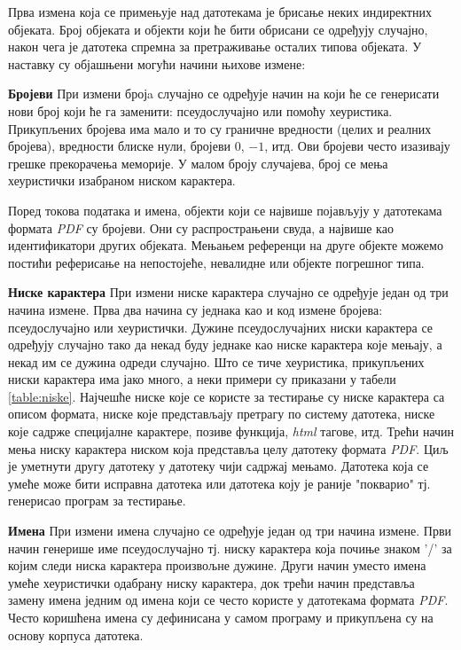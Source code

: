 \documentclass[12pt,oneside]{memoir}
\begin{document}
Прва измена која се примењује над датотекама је брисање неких индиректних објеката. Број објеката и објекти који ће бити обрисани се одређују случајно, након чега је датотека спремна за претраживање осталих типова објеката.
У наставку су објашњени могући начини њихове измене:
\begin{description}
\item{\textbf{Бројеви}} При измени бројa случајно се одређује начин на који ће се генерисати нови број који ће га заменити: псеудослучајно или помоћу хеуристика. Прикупљених бројева има мало и то су граничне вредности (целих и реалних бројева), вредности блиске нули, бројеви $0$, $-1$, итд. Ови бројеви често изазивају грешке прекорачења меморије. У малом броју случајева, број се мења хеуристички изабраном ниском карактера. 

Поред токова података и имена, објекти који се највише појављују у датотекама формата \textit{PDF} су бројеви. Они су распрострањени свуда, а највише као идентификатори других објеката. Мењањем референци на друге објекте можемо постићи реферисање на непостојеће, невалидне или објекте погрешног типа.  
\item{\textbf{Ниске карактера}} При измени ниске карактера случајно се одређује један од три начина измене. Прва два начина су једнака као и код измене бројева: псеудослучајно или хеуристички. Дужине псеудослучајних ниски карактера се одређују случајно тако да некад буду једнаке као ниске карактера које мењају, а некад им се дужина одреди случајно. Што се тиче хеуристика, прикупљених ниски карактера има јако много, а неки примери су приказани у табели \ref{table:niske}. Најчешће ниске које се користе за тестирање су ниске карактера са описом формата, ниске које представљају претрагу по систему датотека, ниске које садрже специјалне карактере, позиве функција, \textit{html} тагове, итд. Трећи начин мења ниску карактера ниском која представља целу датотеку формата \textit{PDF}. Циљ је уметнути другу датотеку у датотеку чији садржај мењамо. Датотека која се умеће може бити исправна датотека или датотека коју је раније "покварио" тј. генерисао програм за тестирање.
\item{\textbf{Имена}} При измени имена случајно се одређује један од три начина измене. Први начин генерише име псеудослучајно тј. ниску карактера која почиње знаком '/' за којим следи ниска карактера произвољне дужине. Други начин уместо имена умеће хеуристички одабрану ниску карактера, док трећи начин представља замену имена једним од имена који се често користе у датотекама формата \textit{PDF}. Често коришћена имена су дефинисана у самом програму и прикупљена су на основу корпуса датотека.

\end{description}
\end{document}
